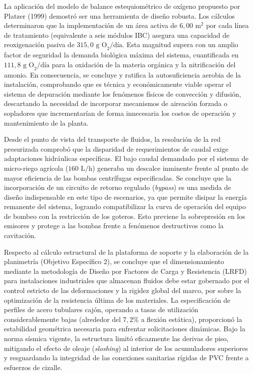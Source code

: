 \documentclass[12pt, letterpaper]{report}
\begin{document}
La aplicación del modelo de balance estequiométrico de oxígeno propuesto por Platzer (1999) demostró ser una herramienta de diseño robusta. Los cálculos determinaron que la implementación de un área activa de $6,00\text{ m}^2$ por cada línea de tratamiento (equivalente a seis módulos IBC) asegura una capacidad de reoxigenación pasiva de $315,0\text{ g O}_2/\text{día}$. Esta magnitud supera con un amplio factor de seguridad la demanda biológica máxima del sistema, cuantificada en $111,8\text{ g O}_2/\text{día}$ para la oxidación de la materia orgánica y la nitrificación del amonio. En consecuencia, se concluye y ratifica la autosuficiencia aerobia de la instalación, comprobando que es técnica y económicamente viable operar el sistema de depuración mediante los fenómenos físicos de convección y difusión, descartando la necesidad de incorporar mecanismos de aireación forzada o sopladores que incrementarían de forma innecesaria los costos de operación y mantenimiento de la planta.

Desde el punto de vista del transporte de fluidos, la resolución de la red presurizada comprobó que la disparidad de requerimientos de caudal exige adaptaciones hidráulicas específicas. El bajo caudal demandado por el sistema de micro-riego agrícola ($160\text{ L/h}$) generaba un descalce inminente frente al punto de mayor eficiencia de las bombas centrífugas especificadas. Se concluye que la incorporación de un circuito de retorno regulado (\textit{bypass}) es una medida de diseño indispensable en este tipo de escenarios, ya que permite disipar la energía remanente del sistema, logrando compatibilizar la curva de operación del equipo de bombeo con la restricción de los goteros. Esto previene la sobrepresión en los emisores y protege a las bombas frente a fenómenos destructivos como la cavitación.

Respecto al cálculo estructural de la plataforma de soporte y la elaboración de la planimetría (Objetivo Específico 2), se concluye que el dimensionamiento mediante la metodología de Diseño por Factores de Carga y Resistencia (LRFD) para instalaciones industriales que almacenan fluidos debe estar gobernado por el control estricto de las deformaciones y la rigidez global del marco, por sobre la optimización de la resistencia última de los materiales. La especificación de perfiles de acero tubulares cajón, operando a tasas de utilización considerablemente bajas (alrededor del $7,2\%$ a flexión estática), proporcionó la estabilidad geométrica necesaria para enfrentar solicitaciones dinámicas. Bajo la norma sísmica vigente, la estructura limitó eficazmente las derivas de piso, mitigando el efecto de oleaje (\textit{sloshing}) al interior de los acumuladores superiores y resguardando la integridad de las conexiones sanitarias rígidas de PVC frente a esfuerzos de cizalle.
\end{document}
